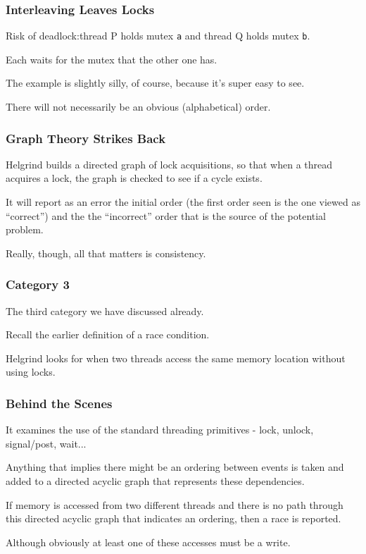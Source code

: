 \begin{frame}
	\frametitle{Interleaving Leaves Locks}

	Risk of deadlock:thread P holds mutex \texttt{a} and thread Q holds mutex \texttt{b}.

	Each waits for the mutex that the other one has.

	The example is slightly silly, of course, because it's super easy to see.

	There will not necessarily be an obvious (alphabetical) order.

\end{frame}

\begin{frame}
	\frametitle{Graph Theory Strikes Back}


	Helgrind builds a directed graph of lock acquisitions, so that when a thread acquires a lock, the graph is checked to see if a cycle exists.

	It will report as an error the initial order (the first order seen is the one viewed as ``correct'') and the the ``incorrect'' order that is the source of the potential problem.

	Really, though, all that matters is consistency.

\end{frame}


\begin{frame}
	\frametitle{Category 3}

	The third category we have discussed already.

	Recall the earlier definition of a race condition.

	Helgrind looks for when two threads access the same memory location without using locks.

\end{frame}

\begin{frame}
	\frametitle{Behind the Scenes}

	It examines the use of the standard threading primitives - lock, unlock, signal/post, wait...

	Anything that implies there might be an ordering between events is taken and added to a directed acyclic graph that represents these dependencies.

	If memory is accessed from two different threads and there is no path through this directed acyclic graph that indicates an ordering, then a race is reported.

	Although obviously at least one of these accesses must be a write.

\end{frame}

